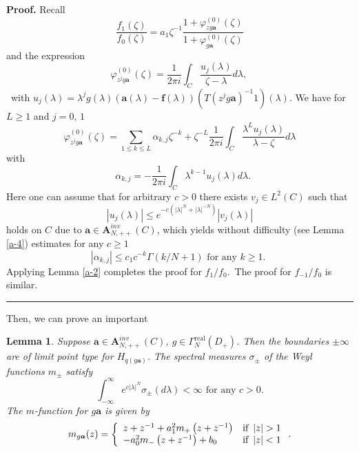 \documentclass[a4paper]{article}%
\newtheorem{lemma}{Lemma}
\newenvironment{proof}[1][Proof]{\noindent\textbf{#1.} }{\ \rule{0.5em}{0.5em}}
\begin{document}
\begin{proof}
Recall
\[
\dfrac{f_{1}\left(  \zeta\right)  }{f_{0}\left(  \zeta\right)  }=a_{1}%
\zeta^{-1}\dfrac{1+\varphi_{zg\boldsymbol{a}}^{\left(  0\right)  }\left(
\zeta\right)  }{1+\varphi_{g\boldsymbol{a}}^{\left(  0\right)  }\left(
\zeta\right)  }%
\]
and the expression%
\[
\varphi_{z^{j}g\boldsymbol{a}}^{\left(  0\right)  }\left(  \zeta\right)
=\dfrac{1}{2\pi i}\int_{C}\dfrac{u_{j}\left(  \lambda\right)  }{\zeta-\lambda
}d\lambda\text{, \ }%
\]
\ with $u_{j}\left(  \lambda\right)  =\lambda^{j}g\left(  \lambda\right)
\left(  \boldsymbol{a}\left(  \lambda\right)  -\boldsymbol{f}\left(
\lambda\right)  \right)  \left(  T\left(  z^{j}g\boldsymbol{a}\right)
^{-1}1\right)  \left(  \lambda\right)  $. We have for $L\geq1$ and $j=0$, $1$%
\[
\varphi_{z^{j}g\boldsymbol{a}}^{\left(  0\right)  }\left(  \zeta\right)
=\sum_{1\leq k\leq L}\alpha_{k,j}\zeta^{-k}+\zeta^{-L}\dfrac{1}{2\pi i}%
\int_{C}\dfrac{\lambda^{L}u_{j}\left(  \lambda\right)  }{\lambda-\zeta
}d\lambda
\]
with%
\[
\text{ }\alpha_{k,j}=-\dfrac{1}{2\pi i}\int_{C}\lambda^{k-1}u_{j}\left(
\lambda\right)  d\lambda\text{.}%
\]
Here one can assume that for arbitrary $c>0$ there exists $v_{j}\in
L^{2}\left(  C\right)  $ such that
\[
\left\vert u_{j}\left(  \lambda\right)  \right\vert \leq e^{-c\left(
\left\vert \lambda\right\vert ^{N}+\left\vert \lambda\right\vert ^{-N}\right)
}\left\vert v_{j}\left(  \lambda\right)  \right\vert
\]
holds on $C$ due to $\boldsymbol{a}\in\boldsymbol{A}_{N,++}^{inv}\left(
C\right)  $, which yields without difficulty (see Lemma \ref{a-4}) estimates
for any $c\geq1$%
\[
\left\vert \alpha_{k,j}\right\vert \leq c_{1}c^{-k}\Gamma\left(  k/N+1\right)
\text{ \ for any }k\geq1\text{. }%
\]
Applying Lemma \ref{a-2} completes the proof for $f_{1}/f_{0}$.\bigskip\ The
proof for $f_{-1}/f_{0}$ is similar.
\end{proof}

Then, we can prove an important

\begin{lemma}
\label{l3-5}Suppose $\boldsymbol{a}\in\boldsymbol{A}_{N,++}^{inv}\left(
C\right)  $, $g\in\Gamma_{N}^{\operatorname{real}}\left(  D_{+}\right)  $.
Then the boundaries $\pm\infty$ are of limit point type for $H_{q\left(
g\boldsymbol{a}\right)  }$. The spectral measures $\sigma_{\pm}$ of the Weyl
functions $m_{\pm}$ satisfy%
\[
\int_{-\infty}^{\infty}e^{c\left\vert \lambda\right\vert ^{N}}\sigma_{\pm
}\left(  d\lambda\right)  <\infty\text{ \ for any }c>0\text{.}%
\]
The $m$-function for $g\boldsymbol{a}$ is given by%
\begin{equation}
m_{g\boldsymbol{a}}(z)=\left\{
\begin{array}
[c]{ll}%
z+z^{-1}+a_{1}^{2}m_{+}\left(  z+z^{-1}\right)  & \text{if }\left\vert
z\right\vert >1\\
-a_{0}^{2}m_{-}\left(  z+z^{-1}\right)  +b_{0} & \text{if }\left\vert
z\right\vert <1
\end{array}
\right.  \text{.} \label{3-12}%
\end{equation}

\end{lemma}
\end{document}
